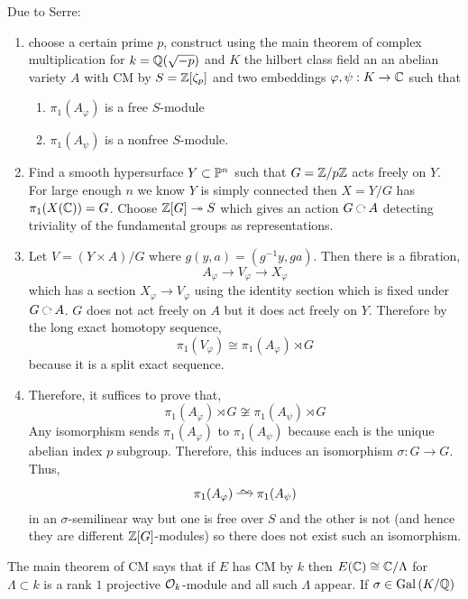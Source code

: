 \documentclass[12pt]{article}
\begin{document}
\begin{example}
Due to Serre: 
\begin{enumerate}
\item choose a certain prime $p$, construct using the main theorem of complex multiplication for $k = \Q(\sqrt{-p})$ and $K$ the hilbert class field an an abelian variety $A$ with CM by $S = \Z[\zeta_p]$ and two embeddings $\varphi, \psi : K \to \CC$ such that
\begin{enumerate}
\item $\pi_1(A_\varphi)$ is a free $S$-module
\item $\pi_1(A_{\psi})$ is a nonfree $S$-module.
\end{enumerate}
\item Find a smooth hypersurface $Y \subset \P^n$ such that $G = \Z / p \Z$ acts freely on $Y$. For large enough $n$ we know $Y$ is simply connected then $X = Y / G$ has $\pi_1(X(\CC)) = G$. Choose $\Z[G] \onto S$ which gives an action $G \acts A$ detecting triviality of the fundamental groups as representations.
\item Let $V = (Y \times A)/G$ where $g(y,a) = (g^{-1} y, g a)$. Then there is a fibration,
\[ A_\varphi \to V_\varphi \to X_\varphi \]
which has a section $X_\varphi \to V_\varphi$ using the identity section which is fixed under $G \acts A$.  $G$ does not act freely on $A$ but it does act freely on $Y$. Therefore by the long exact homotopy sequence,
\[ \pi_1(V_\varphi) \cong \pi_1(A_\varphi) \rtimes G \]
because it is a split exact sequence.
\item  Therefore, it suffices to prove that,
\[ \pi_1(A_\varphi) \rtimes G \not\cong \pi_1(A_\psi) \rtimes G \]
Any isomorphism sends $\pi_1(A_\varphi)$ to $\pi_1(A_\psi)$ because each is the unique abelian index $p$ subgroup. Therefore, this induces an isomorphism $\sigma : G \to G$. Thus,
\[ \pi_1(A_\varphi) \iso \pi_1(A_\psi) \]
in an $\sigma$-semilinear way but one is free over $S$ and the other is not (and hence they are different $\Z[G]$-modules) so there does not exist such an isomorphism. 
\end{enumerate}
\end{example}

\begin{rmk}
The main theorem of CM says that if $E$ has CM by $k$ then $E(\CC) \cong \CC / \Lambda$ for $\Lambda \subset k$ is a rank $1$ projective $\struct{k}$-module and all such $\Lambda$ appear. If $\sigma \in \Gal{K/\Q}$   
\end{rmk}
\end{document}
